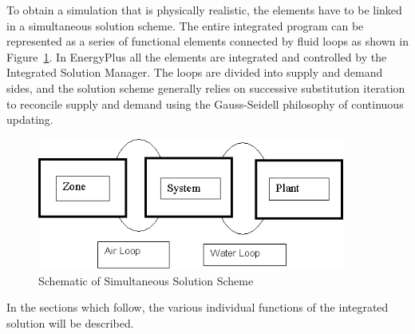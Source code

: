 To obtain a simulation that is physically realistic, the elements have to be linked in a simultaneous solution scheme. The entire integrated program can be represented as a series of functional elements connected by fluid loops as shown in Figure~\ref{fig:schematic-of-simultaneous-solution-scheme}. In EnergyPlus all the elements are integrated and controlled by the Integrated Solution Manager. The loops are divided into supply and demand sides, and the solution scheme generally relies on successive substitution iteration to reconcile supply and demand using the Gauss-Seidell philosophy of continuous updating.

\begin{figure}[hbtp] %
\centering
\includegraphics[width=0.9\textwidth, height=0.9\textheight, keepaspectratio=true]{media/image8.png}
\caption{Schematic of Simultaneous Solution Scheme \protect \label{fig:schematic-of-simultaneous-solution-scheme}}
\end{figure}

In the sections which follow, the various individual functions of the integrated solution will be described.
